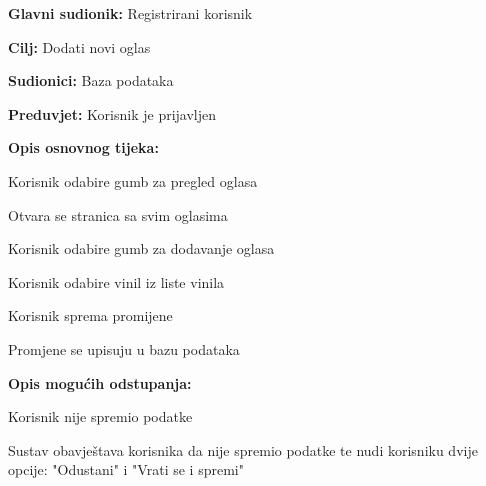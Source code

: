 				\noindent {}
					\begin{packed_item}
	
						\item \textbf{Glavni sudionik: }Registrirani korisnik
						\item  \textbf{Cilj:} Dodati novi oglas
						\item  \textbf{Sudionici:} Baza podataka
						\item  \textbf{Preduvjet:} Korisnik je prijavljen
						\item  \textbf{Opis osnovnog tijeka:}
						
						\item[] \begin{packed_enum}
	
							\item Korisnik odabire gumb za pregled oglasa
							\item Otvara se stranica sa svim oglasima
							\item Korisnik odabire gumb za dodavanje oglasa
							\item Korisnik odabire vinil iz liste vinila
							\item Korisnik sprema promijene
							\item Promjene se upisuju u bazu podataka

						\end{packed_enum}
						
						\item  \textbf{Opis mogućih odstupanja:}
						
						\item[] \begin{packed_item}
								
							\item[5.a] Korisnik nije spremio podatke
								\begin{packed_item}
									\item Sustav obavještava korisnika da nije spremio podatke te nudi korisniku dvije opcije: "Odustani" i "Vrati se i spremi"
								\end{packed_item}
								
								
						\end{packed_item}					
					\end{packed_item}
					
